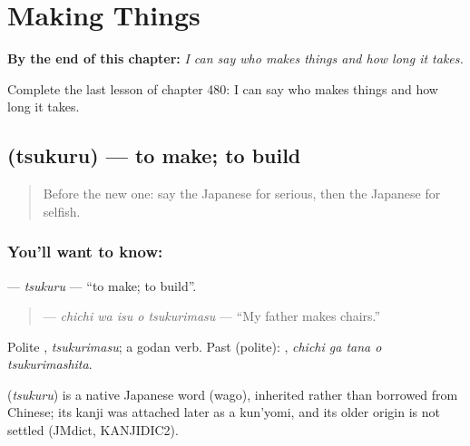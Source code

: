 
\chapter{Making Things}
\label{ch:ja-making-things}

\begin{chapteropening}
\textbf{By the end of this chapter:} \emph{I can say who makes things and how long it takes.}

Complete the last lesson of chapter 480: I can say who makes things and how long it takes.
\end{chapteropening}

\section[\texorpdfstring{\ja{つくる} (tsukuru)}{つくる (tsukuru)}]{ (tsukuru) — to make; to build}

\label{lesson:JA-C480-tsukuru}



\begin{quote}
Before the new one: say the Japanese for serious, then the Japanese for selfish.
\end{quote}

\subsection*{You'll want to know: }
\textbf{} — \emph{tsukuru} — \textquotedblleft{}to make; to build\textquotedblright{}.

\begin{quote}
\textbf{  } — \emph{chichi wa isu o tsukurimasu} — \textquotedblleft{}My father makes chairs.\textquotedblright{}
\end{quote}

Polite \textbf{}, \emph{tsukurimasu}; a godan verb. Past (polite): \textbf{  }, \emph{chichi ga tana o tsukurimashita}.

\begin{cousinweb}
\textbf{} (\emph{tsukuru}) is a native Japanese word (wago), inherited rather than borrowed from Chinese; its kanji was attached later as a kun'yomi, and its older origin is not settled (JMdict, KANJIDIC2).
\end{cousinweb}

